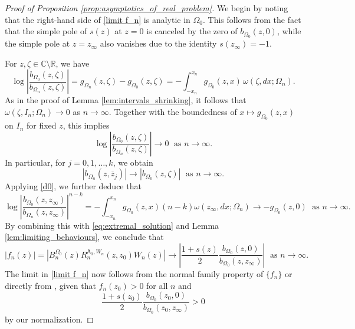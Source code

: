 \documentclass[12pt,oneside,reqno]{amsart}
\theoremstyle{definition}
\numberwithin{equation}{section}
\newcommand{\R}{{\mathbb R}}
\newcommand{\C}{{\mathbb C}}
\newcommand{\sfA}{\mathsf{A}}
\begin{document}
\begin{proof}[Proof of Proposition \ref{prop:asymptotics_of_real_problem}]
We begin by noting that the right-hand side of \eqref{limit f_n} is analytic in $\Omega_0$. This follows from the fact that the simple pole of $s(z)$ at $z=0$ is canceled by the zero of $b_{\Omega_0}(z,0)$, while the simple pole at $z=z_\infty$ also vanishes due to the identity $s(z_\infty)=-1$.

For $z,\zeta\in \C\setminus\R$, we have 
	\[\log\left|\frac{b_{\Omega_0}(z,\zeta)}{b_{\Omega_n}(z,\zeta)}\right| = g_{\Omega_n}(z,\zeta)-g_{\Omega_0}(z,\zeta) = -\int_{-x_n}^{x_n}g_{\Omega_0}(z,x)\,\omega(\zeta,dx;\Omega_n).\]
	As in the proof of Lemma \ref{lem:intervals_shrinking}, it follows that $\omega(\zeta,I_n;\Omega_n) \rightarrow 0$ as $n\rightarrow \infty$. Together with the boundedness of $x\mapsto g_{\Omega_0}(z,x)$ on $I_n$ for fixed $z$, this implies
	\[\log\left|\frac{b_{\Omega_0}(z,\zeta)}{b_{\Omega_n}(z,\zeta)}\right|\longrightarrow 0 \; \mbox{ as } n\rightarrow \infty.\]
	In particular, for $j=0, 1, \ldots, k$, we obtain 
	\[ |b_{\Omega_n}(z, \overline{z}_j)|\rightarrow |b_{\Omega_0}(z,\zeta)| \; \mbox{ as } n\rightarrow \infty. \]  
	Applying \eqref{d0}, we further deduce that
	\[\log\left|\frac{b_{\Omega_0}(z,z_\infty)}{b_{\Omega_n}(z,z_\infty)}\right|^{n-k} = -\int_{-x_n}^{x_n}g_{\Omega_0}(z,x)(n-k)\omega(z_\infty,dx;\Omega_n)\longrightarrow -g_{\Omega_0}(z,0) \; \text{ as } n\rightarrow \infty.\]	
	By combining this with \eqref{eq:extremal_solution} and Lemma \ref{lem:limiting_behaviours}, we conclude that 
	\[|f_n(z)| = \left|B_n^{\Omega_0}(z)R_n^{\sfA_0,W_n}(z,z_0)W_n(z)\right| \longrightarrow \left|\frac{1+s(z)}{2}\frac{b_{\Omega_0}(z,0)}{b_{\Omega_0}(z,z_\infty)}\right| \; \text{ as }n\rightarrow \infty.
	\]
The limit in \eqref{limit f_n} now follows from the normal family property of $\{ f_n \}$ or directly from \cite[Prop.~4.2]{christiansen-simon-zinchenko-II}, given that $f_n(z_0)>0$ for all $n$ and
\[
   \frac{1+s(z_0)}{2}\frac{b_{\Omega_0}(z_0,0)}{b_{\Omega_0}(z_0,z_\infty)}>0
\]
by our normalization.	
%	
\end{proof}
\end{document}
